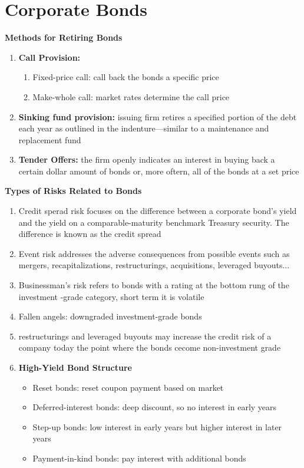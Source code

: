 \documentclass[11pt,fleqn]{book} %
\numberwithin{equation}{section} %
\numberwithin{figure}{section} %
\numberwithin{table}{section} %
\begin{document}
\chapter{Corporate Bonds}
\begin{definition}\textbf{Methods for Retiring Bonds}
    \begin{enumerate}
        \item \textbf{Call Provision:}
        \begin{enumerate}
            \item Fixed-price call: call back the bonds a specific price
            \item Make-whole call: market rates determine the call price
        \end{enumerate}
        \item \textbf{Sinking fund provision:} issuing firm retires a specified portion of the debt
        each year as outlined in the indenture---similar to a maintenance and replacement fund
        \item \textbf{Tender Offers:} the firm openly indicates an interest in buying back a certain
        dollar amount of bonds or, more oftern, all of the bonds at a set price
    \end{enumerate}
\end{definition}
\begin{definition}\textbf{Types of Risks Related to Bonds}
    \begin{enumerate}
        \item Credit sperad risk focuses on the difference between a corporate bond's
        yield and the yield on a comparable-maturity benchmark Treasury security.
        The difference is known as the credit spread
        \item Event risk addresses the adverse consequences from possible events such as
        mergers, recapitalizations, restructurings, acquisitions, leveraged buyouts... 
        \item Businessman's risk refers to bonds with a rating at the bottom rung of the investment
        -grade category, short term it is volatile
        \item Fallen angels: downgraded investment-grade bonds
        \item restructurings and leveraged buyouts may increase the credit risk of a company today
        the point where the bonds cecome non-investment grade
        \item \textbf{High-Yield Bond Structure}
        \begin{itemize}
            \item Reset bonds: reset coupon payment based on market
            \item Deferred-interest bonds: deep discount, so no interest in early years
            \item Step-up bonds: low interest in early years but higher interest in later years
            \item Payment-in-kind bonds: pay interest with additional bonds
        \end{itemize}
    \end{enumerate}
\end{definition}
\end{document}
